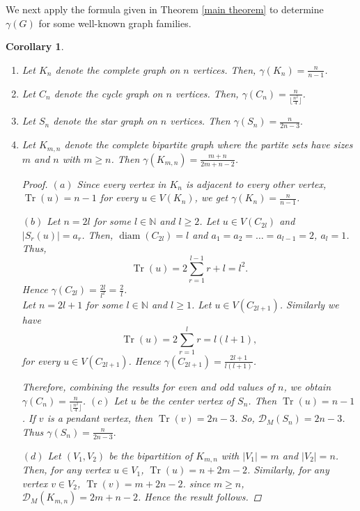 \documentclass[12pt]{article}
\newtheorem{cor}{Corollary}[section]
\DeclareMathOperator{\diam}{diam}
\DeclareMathOperator{\tr}{Tr}
\begin{document}
{{			We next apply the formula given in Theorem \ref{main theorem} to determine $\gamma(G)$ for some well-known graph families.
			\begin{cor}\label{basic examples}
				\begin{enumerate}
					\item [(a)] Let $K_n$ denote the complete graph on $n$ vertices. Then, $\gamma(K_n)=\frac{n}{n-1}$.
					\item [(b)] Let $C_n$ denote the cycle graph on $n$ vertices. Then,
					$\gamma(C_n)=\frac{n}{\lfloor \frac{n^2}{4}\rfloor}$.
					\item[(c)] Let $S_n$ denote the star graph on $n$ vertices. Then $\gamma(S_n)=\frac{n}{2n-3}.$\label{star graph}
					
					
					
					\item[(d)]   Let $K_{m,n}$ denote the complete bipartite graph where the partite sets have sizes $m$ and $n$ with $m \geq n$. Then $\gamma(K_{m,n})=\frac{m+n}{2m+n-2}$.
					
					\begin{proof}
						\textbf{$(a)$} Since every vertex in $K_n$ is adjacent to every other vertex, $\tr(u)=n-1$ for every $u \in V(K_n)$, we get $\gamma (K_n) = \frac{n}{n-1}$.
						
						\textbf{$(b)$} Let $n=2l$ for some $l \in \mathbb{N}$ and $l \geq 2$. Let $u \in V(C_{2l})$ and $\vert S_r(u) \vert=a_r$. Then,
						$\diam(C_{2l})=l$ and $a_1=a_2=\dots=a_{l-1}=2$, $a_l=1$. Thus,
						$$
						\tr(u)=2\sum^{l-1}_{r=1}r+l=l^2.
						$$
						Hence $\gamma(C_{2l})=\frac{2l}{l^2}=\frac{2}{l}$.\\
						
						Let $n=2l+1$ for some $l \in \mathbb{N}$ and $l \geq 1$. Let $u \in  V(C_{2l+1})$. Similarly we have
						$$
						\tr(u)=2\sum^{l}_{r=1}r=l(l+1),
						$$
						for every $u\in V(C_{2l+1})$. Hence $\gamma(C_{2l+1})=\frac{2l+1}{l(l+1)}$.
						
						Therefore, combining the results for even and odd values of $n$, we obtain $\gamma(C_n)=\frac{n}{\lfloor \frac{n^2}{4}\rfloor}$.
						\textbf{$(c)$} Let $u$ be the center vertex of $S_n$. Then $\tr(u)=n-1$. If $v$ is a pendant vertex, then $\tr(v)=2n-3$. So, $\mathcal{D}_M(S_n)=2n-3$. Thus $\gamma(S_n)=\frac{n}{2n-3}.$
						
						
						\textbf{$(d)$} Let $(V_1,V_2)$ be the bipartition of $K_{m,n}$ with $\vert V_1\vert=m$ and $\vert V_2\vert=n$. Then, for any vertex $u\in V_1$, $\tr(u)=n+2m-2$. Similarly, for any vertex $v \in V_2$, $\tr(v)=m+2n-2$. since $m\geq n$, $\mathcal{D}_M(K_{m,n})=2m+n-2$. Hence the result follows.
					\end{proof}
					

\end{enumerate}
\end{cor}}}
\end{document}
